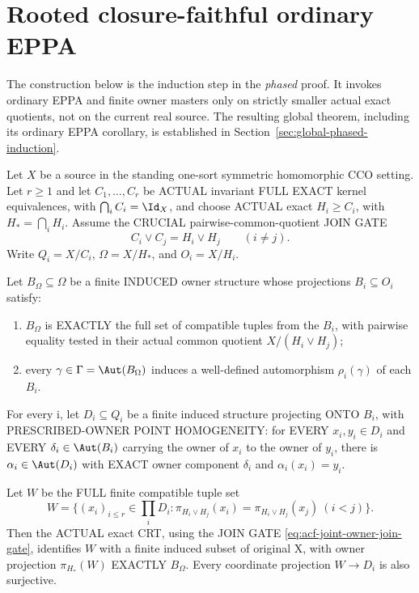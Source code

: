 \section{Rooted closure-faithful ordinary EPPA}
\label{sec:acf-main}

The construction below is the induction step in the
\emph{phased} proof.  It invokes ordinary EPPA and finite
owner masters only on strictly smaller actual exact quotients,
not on the current real source.  The resulting global theorem,
including its ordinary EPPA corollary, is established in
Section~\ref{sec:global-phased-induction}.

\begin{lemma}
\label{lem:acf-multi-owner-point-homogeneity}
Let $X$ be a source in the standing one-sort symmetric
homomorphic CCO setting. Let $r\ge1$ and let
$C_1,\ldots,C_r$ be ACTUAL
invariant FULL EXACT kernel
equivalences, with
$\bigcap_i C_i=\Id_X$,
and choose ACTUAL exact
$H_i\ge C_i$, with
$H_*=\bigcap_i H_i$.
Assume the CRUCIAL
pairwise-common-quotient
JOIN GATE
\[
               C_i\vee C_j
                  =H_i\vee H_j
                          \qquad(i\ne j).
\tag{JOG}\label{eq:acf-joint-owner-join-gate}
\]
Write $Q_i=X/C_i$,
$\Omega=X/H_*$, and
$O_i=X/H_i$.

Let $B_\Omega\subseteq\Omega$
be a finite INDUCED owner
structure whose projections
$B_i\subseteq O_i$ satisfy:
\begin{enumerate}[label=(\roman*)]
\item $B_\Omega$ is EXACTLY
the full set of compatible
tuples from the $B_i$,
with pairwise equality
tested in their actual
common quotient
$X/(H_i\vee H_j)$;
\item every
$\gamma\in\Gamma=
 \Aut(B_\Omega)$ induces
a well-defined automorphism
$\rho_i(\gamma)$ of each $B_i$.
\end{enumerate}
For every i, let
$D_i\subseteq Q_i$ be
a finite induced structure
projecting ONTO $B_i$,
with PRESCRIBED-OWNER POINT
HOMOGENEITY:
for EVERY $x_i,y_i\in D_i$
and EVERY
$\delta_i\in\Aut(B_i)$
carrying the owner of
$x_i$ to the owner of
$y_i$, there is
$\alpha_i\in\Aut(D_i)$
with EXACT owner component
$\delta_i$ and
$\alpha_i(x_i)=y_i$.

Let $W$ be the FULL finite
compatible tuple set
\[
 W=\{(x_i)_{i\le r}\in
             \prod_i D_i:
    \pi_{H_i\vee H_j}(x_i)=
    \pi_{H_i\vee H_j}(x_j)
                        \ (i<j)\}.
\tag{JOW}\label{eq:acf-joint-owner-full-witness}
\]
Then the ACTUAL exact CRT,
using the JOIN GATE
\eqref{eq:acf-joint-owner-join-gate},
identifies $W$ with a
finite induced subset of
original X, with owner
projection $\pi_{H_*}(W)$
EXACTLY $B_\Omega$.
Every coordinate projection $W\to D_i$ is also surjective.


\end{lemma}
